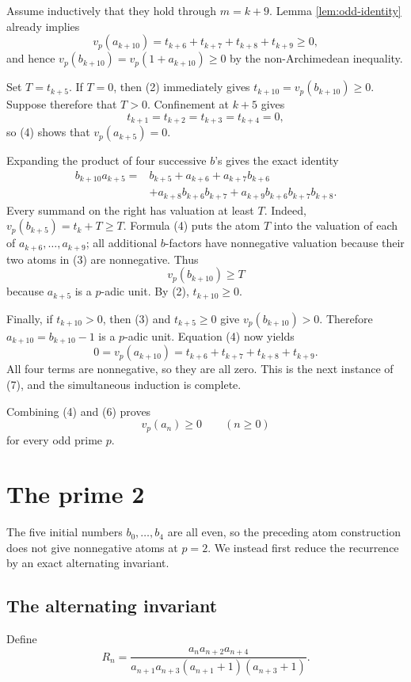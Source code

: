 \documentclass[11pt]{article}
\theoremstyle{remark}
\newcommand{\vp}{v_p}
\begin{document}
Assume inductively that they hold through $m=k+9$.  Lemma
\ref{lem:odd-identity} already implies
\[
 \vp(a_{k+10})=t_{k+6}+t_{k+7}+t_{k+8}+t_{k+9}\geq0,
\]
and hence $\vp(b_{k+10})=\vp(1+a_{k+10})\geq0$ by the
non-Archimedean inequality.

Set $T=t_{k+5}$.  If $T=0$, then (2) immediately gives
$t_{k+10}=\vp(b_{k+10})\geq0$.  Suppose therefore that $T>0$.
Confinement at $k+5$ gives
\[
 t_{k+1}=t_{k+2}=t_{k+3}=t_{k+4}=0,
\]
so (4) shows that $\vp(a_{k+5})=0$.

Expanding the product of four successive $b$'s gives the exact identity
\[
\begin{aligned}
 b_{k+10}a_{k+5}
={}&b_{k+5}+a_{k+6}+a_{k+7}b_{k+6}\\
 &+a_{k+8}b_{k+6}b_{k+7}
  +a_{k+9}b_{k+6}b_{k+7}b_{k+8}.                               \tag{9}
\end{aligned}
\]
Every summand on the right has valuation at least $T$.  Indeed,
$\vp(b_{k+5})=t_k+T\geq T$.  Formula (4) puts the atom $T$ into
the valuation of each of $a_{k+6},\ldots,a_{k+9}$; all additional
$b$-factors have nonnegative valuation because their two atoms in (3)
are nonnegative.  Thus
\[
 \vp(b_{k+10})\geq T
\]
because $a_{k+5}$ is a $p$-adic unit.  By (2), $t_{k+10}\geq0$.

Finally, if $t_{k+10}>0$, then (3) and $t_{k+5}\geq0$ give
$\vp(b_{k+10})>0$.  Therefore
$a_{k+10}=b_{k+10}-1$ is a $p$-adic unit.  Equation (4) now yields
\[
 0=\vp(a_{k+10})=t_{k+6}+t_{k+7}+t_{k+8}+t_{k+9}.
\]
All four terms are nonnegative, so they are all zero.  This is the next
instance of (7), and the simultaneous induction is complete.

Combining (4) and (6) proves
\[
 \vp(a_n)\geq0
 \qquad(n\geq0)
\]
for every odd prime $p$.

\section{The prime 2}

The five initial numbers $b_0,\ldots,b_4$ are all even, so the preceding
atom construction does not give nonnegative atoms at $p=2$.  We instead
first reduce the recurrence by an exact alternating invariant.

\subsection{The alternating invariant}

Define
\[
 R_n=
 \frac{a_na_{n+2}a_{n+4}}
 {a_{n+1}a_{n+3}(a_{n+1}+1)(a_{n+3}+1)}.                        \tag{10}
\]
\end{document}
